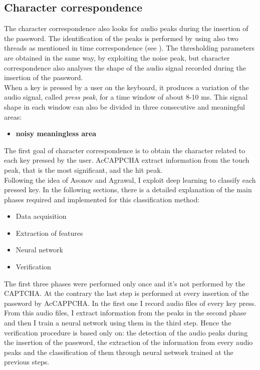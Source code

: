 \subsection{Character correspondence}\label{AcCAPPCHA:char_correspondence}
The character correspondence also looks for audio peaks during the insertion of the password. The identification of the peaks is performed by using also two threads as mentioned in time correspondence (see ). The thresholding parameters are obtained in the same way, by exploiting the noise peak, but character correspondence also analyses the shape of the audio signal recorded during the insertion of the password.\\
When a key is pressed by a user on the keyboard, it produces a variation of the audio signal, called \textit{press peak}, for a time window of about 8-10 ms\cite{keyboard_acoustic}. This signal shape in each window can also be divided in three consecutive and meaningful areas:
\begin{itemize}
\item{\textbf{noisy meaningless area}}
\end{itemize}
The first goal of character correspondence is to obtain the character related to each key pressed by the user. AcCAPPCHA extract information from the touch peak, that is the most significant, and the hit peak.\\
Following the idea of Asonov and Agrawal, I exploit deep learning to classify each pressed key. In the following sections, there is a detailed explanation of the main phases required and implemented for this classification method:
\begin{itemize}
\item{Data acquisition}
\item{Extraction of features}
\item{Neural network}
\item{Verification}
\end{itemize}
The first three phases were performed only once and it's not performed by the CAPTCHA. At the contrary the last step is performed at every insertion of the password by AcCAPPCHA.
In the first one I record audio files of every key press. From this audio files, I extract information from the peaks in the second phase and then I train a neural network using them in the third step. Hence the verification procedure is based only on: the detection of the audio peaks during the insertion of the password, the extraction of the information from every audio peaks and the classification of them through neural network trained at the previous steps.

